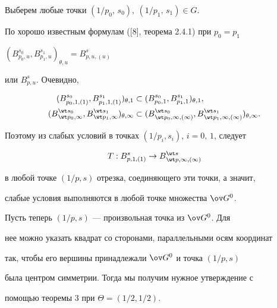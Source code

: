 \begin{pf}


Выберем любые точки $(1/p_0,\, s_0),\ (1/p_1,\,s_1) \in G$.


По хорошо известным формулам ([8], теорема 2.4.1) при $p_0=p_1$\;


$(B^{s_0}_{p_0,u}, B^{s_1}_{p_1,u})_{\theta,u} = B^s_{p,u,(u)}$


или $B^s_{p,u}$. Очевидно,


\begin{align*}


(B^{s_0}_{p_0,1,(1)}, B^{s_1}_{p_1,1,(1)})_{\theta,1} &\subset


(B^{s_0}_{p_0,1}, B^{s_1}_{p_1,1})_{\theta,1}, \\


%


(B{}^{\wt s_0}_{\wt p_0,\infty },


B{}^{\wt s_1}_{\wt p_1,\infty })_{\theta,\infty } &\subset


(B{}^{\wt s_0}_{\wt p_0,\infty, (\infty ) },


B{}^{\wt s_1}_{\wt p_1,\infty, (\infty) })_{\theta,\infty }.


\end{align*}


Поэтому из слабых условий в точках $(1/p_i,s_i)$, $i=0,\,1$, следует


$$


T:B^s_{p,1,(1)}\rightarrow B{}^{\wt s}_{\wt p, \infty,(\infty )}


$$


в любой точке $(1/p,s)$ отрезка, соединяющего эти точки, а значит,


слабые условия выполняются в любой точке множества $\ov G^0$.





Пусть теперь $(1/p,s)$ --- произвольная точка из $ \ov G^0$. Для


нее можно указать квадрат со сторонами, параллельными осям координат


так, чтобы его вершины принадлежали $\ov G^0$ и точка $(1/p,s)$


была центром симметрии. Тогда мы получим нужное утверждение с


помощью теоремы 3 при $\Theta = (1/2,1/2)$.


\end{pf}






